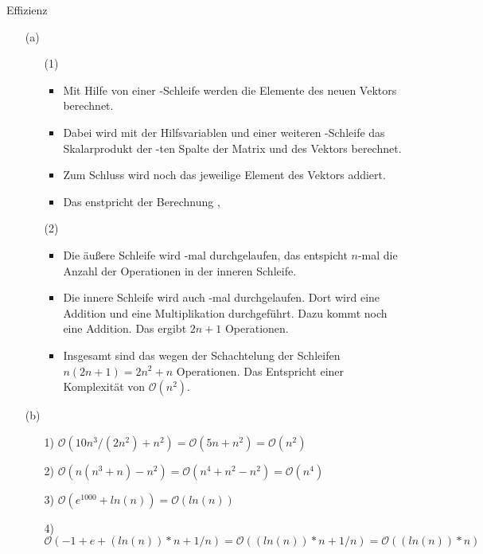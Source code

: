 \begin{exercise}{Effizienz}
\begin{body}
\end{body}
\begin{solution}
\begin{small}
\begin{itemize}
  \item [(a)]
  \begin{itemize}
    \item[(1)]
    \begin{itemize}
      \item Mit Hilfe von einer -Schleife werden die Elemente des neuen Vektors  berechnet.
      \item Dabei wird mit der Hilfsvariablen  und einer weiteren -Schleife das Skalarprodukt der -ten Spalte der Matrix  und des Vektors  berechnet.
      \item Zum Schluss wird noch das jeweilige Element des Vektors  addiert.
      \item Das enstpricht der Berechnung ,
    \end{itemize}
    \item[(2)]
    \begin{itemize}
      \item Die \"au\ss ere Schleife wird -mal durchgelaufen, das entspicht $n$-mal die Anzahl der Operationen in der inneren Schleife.
      \item Die innere Schleife wird auch -mal durchgelaufen.
            Dort wird eine Addition und eine  Multiplikation durchgef\"uhrt.
            Dazu kommt noch eine Addition.
            Das ergibt $2n+1$ Operationen.
      \item Insgesamt sind  das wegen der Schachtelung der Schleifen $n(2n+1)=2n^2+n$ Operationen.
            Das Entspricht einer Komplexit\"at von $\mathcal{O}(n^2)$.
    \end{itemize}
  \end{itemize}
  \item[(b)]
  \begin{itemize}
    \item [1)] $\mathcal{O}(10n^3/(2n^2)+n^2) = \mathcal{O}(5n + n^2) = \mathcal{O}(n^2)$
    \item [2)] $\mathcal{O}(n(n^3+n)-n^2) = \mathcal{O}(n^4 + n^2 - n^2) = \mathcal{O}(n^4)$
    \item [3)] $\mathcal{O}(e^{1000}+ln (n)) = \mathcal{O}(ln (n))$
    \item [4)] $\mathcal{O}(-1+e+(ln(n))*n +1/n) = \mathcal{O}((ln(n)) * n + 1/n) = \mathcal{O}((ln(n)) * n)$
  \end{itemize}
\end{itemize}
\end{small}
\end{solution}
\end{exercise}
